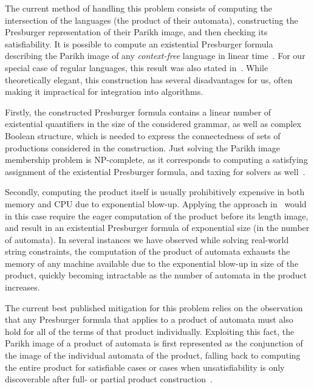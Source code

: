   The current method of handling this problem consists of computing the
  intersection of the languages (the product of their automata),
  constructing the Presburger representation of their Parikh image, and then
  checking its satisfiability. It is possible to compute an existential
   Presburger formula describing the
  Parikh image of any \emph{context-free} language in linear
  time~\cite{generate-parikh-image}. For our special case of regular languages,
  this result was also stated in~\cite{muscholl-linear}. While theoretically
  elegant, this construction has several disadvantages for us, often making it
  impractical for integration into algorithms.
  
  Firstly, the constructed Presburger
  formula contains a linear number of existential quantifiers in the size of the
  considered grammar, as well as complex Boolean structure, which is needed to
  express the connectedness of sets of productions considered in the construction.%
  \iffalse{}Eliminating those quantifiers to obtain a quantifier-free representation of the
  Parikh image has exponential complexity~\cite{DBLP:conf/issac/Weispfenning97},
  and is often impossible in reasonable time.\fi{}%
  Just solving the Parikh image
  membership problem is NP-complete, as it corresponds to computing a satisfying
  assignment of the existential Presburger formula, and taxing for solvers as
  well~\cite{ostrich-plus}.
  
  Secondly, computing the product itself is usually prohibitively expensive
  in both memory and CPU due to exponential blow-up. Applying the approach in~\cite{generate-parikh-image} would in
  this case require the eager computation of the product before its length image,
  and result in an existential Presburger formula of exponential size (in the
  number of automata). In several instances we have observed while solving
  real-world string constraints, the computation of the product of automata
  exhausts the memory of any machine available due to the exponential blow-up in
  size of the product, quickly becoming intractable as the number of automata in
  the product increases.
  
  The current best published mitigation for this problem relies on the observation
  that any Presburger formula that applies to a product of automata must also hold
  for all of the terms of that product individually. Exploiting this fact, the Parikh
  image of a product of automata is first represented as the conjunction of the image of
  the individual automata of the product, falling back to computing the entire product
  for satisfiable cases or cases when unsatisfiability is only discoverable after
  full- or partial product construction~\cite{approximate-parikh}.


